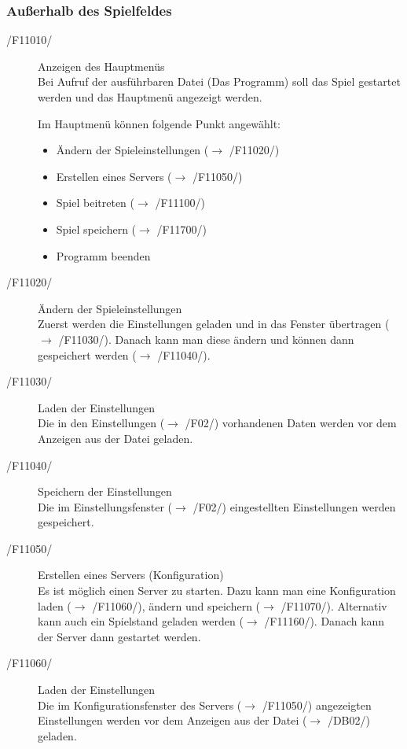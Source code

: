 \documentclass[a4paper,10pt]{article}
\begin{document}
\subsubsection{Außerhalb des Spielfeldes}
\begin{description}
\item[/F11010/] Anzeigen des Hauptmenüs \\
Bei Aufruf der ausführbaren Datei (Das Programm) soll das Spiel gestartet werden und das Hauptmenü angezeigt werden.

Im Hauptmenü können folgende Punkt angewählt:
\begin{itemize}
\item Ändern der Spieleinstellungen ($\rightarrow$ /F11020/)
\item Erstellen eines Servers ($\rightarrow$ /F11050/)
\item Spiel beitreten ($\rightarrow$ /F11100/)
\item Spiel speichern ($\rightarrow$ /F11700/)
\item Programm beenden
\end{itemize}

\item[/F11020/] Ändern der Spieleinstellungen \\
Zuerst werden die Einstellungen geladen und in das Fenster übertragen ($\rightarrow$ /F11030/). Danach kann man diese ändern und können dann gespeichert werden ($\rightarrow$ /F11040/).

\item[/F11030/] Laden der Einstellungen \\
Die in den Einstellungen ($\rightarrow$ /F02/) vorhandenen Daten werden vor dem Anzeigen aus der Datei geladen.

\item[/F11040/] Speichern der Einstellungen \\
Die im Einstellungsfenster ($\rightarrow$ /F02/) eingestellten Einstellungen werden gespeichert.

\item[/F11050/] Erstellen eines Servers (Konfiguration) \\
Es ist möglich einen Server zu starten. Dazu kann man eine Konfiguration laden ($\rightarrow$ /F11060/), ändern und speichern ($\rightarrow$ /F11070/). Alternativ kann auch ein Spielstand geladen werden ($\rightarrow$ /F11160/). Danach kann der Server dann gestartet werden.

\item[/F11060/] Laden der Einstellungen \\
Die im Konfigurationsfenster des Servers ($\rightarrow$ /F11050/) angezeigten Einstellungen werden vor dem Anzeigen aus der Datei ($\rightarrow$ /DB02/) geladen.


\end{description}
\end{document}
